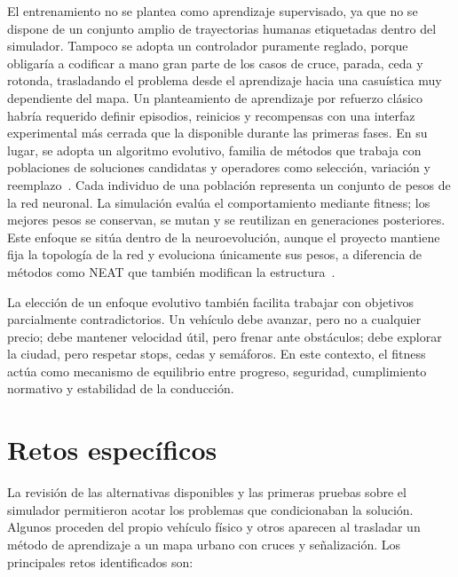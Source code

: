 El entrenamiento no se plantea como aprendizaje supervisado, ya que no se dispone de un conjunto amplio de trayectorias humanas etiquetadas dentro del simulador. Tampoco se adopta un controlador puramente reglado, porque obligaría a codificar a mano gran parte de los casos de cruce, parada, ceda y rotonda, trasladando el problema desde el aprendizaje hacia una casuística muy dependiente del mapa. Un planteamiento de aprendizaje por refuerzo clásico habría requerido definir episodios, reinicios y recompensas con una interfaz experimental más cerrada que la disponible durante las primeras fases. En su lugar, se adopta un algoritmo evolutivo, familia de métodos que trabaja con poblaciones de soluciones candidatas y operadores como selección, variación y reemplazo~\cite{eiben}. Cada individuo de una población representa un conjunto de pesos de la red neuronal. La simulación evalúa el comportamiento mediante fitness; los mejores pesos se conservan, se mutan y se reutilizan en generaciones posteriores. Este enfoque se sitúa dentro de la neuroevolución, aunque el proyecto mantiene fija la topología de la red y evoluciona únicamente sus pesos, a diferencia de métodos como NEAT que también modifican la estructura~\cite{stanley}.

La elección de un enfoque evolutivo también facilita trabajar con objetivos parcialmente contradictorios. Un vehículo debe avanzar, pero no a cualquier precio; debe mantener velocidad útil, pero frenar ante obstáculos; debe explorar la ciudad, pero respetar stops, cedas y semáforos. En este contexto, el fitness actúa como mecanismo de equilibrio entre progreso, seguridad, cumplimiento normativo y estabilidad de la conducción.

\clearpage
\section{Retos específicos}

La revisión de las alternativas disponibles y las primeras pruebas sobre el simulador permitieron acotar los problemas que condicionaban la solución. Algunos proceden del propio vehículo físico y otros aparecen al trasladar un método de aprendizaje a un mapa urbano con cruces y señalización. Los principales retos identificados son:


